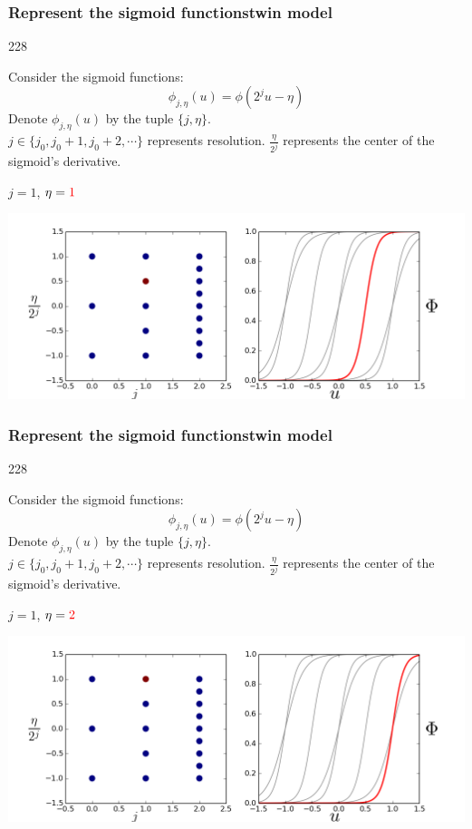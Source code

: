 \documentclass{beamer}
\newcommand{\barrow}{\item[\color{darkred}\ding{228}]}
\begin{document}
\setcounter{framenumber}{16} 
\begin{frame}
    \frametitle{Represent the sigmoid functions\hfill \scriptsize{twin model}}\small
    \begin{dinglist}{228}
        \barrow
        Consider the sigmoid functions:
        $$
            \phi_{j, \eta}(u) = \phi(2^j u - \eta)
        $$
        Denote $\phi_{j, \eta}(u)$ by the tuple $\{j, \eta\}$.\\
        \vspace{.2cm}
        $j\in \{j_0, j_0+1, j_0+2, \cdots \}$ represents resolution. $\frac{\eta}{2^j}$ represents
        the center of the sigmoid's derivative.
        \barrow $j=1$, $\eta=\textcolor{red}{1}$\\
        \begin{center}
            \includegraphics[width=10.cm]{basis_6.png}
        \end{center}
    \end{dinglist}
\end{frame}

\setcounter{framenumber}{16} 
\begin{frame}
    \frametitle{Represent the sigmoid functions\hfill \scriptsize{twin model}}\small
    \begin{dinglist}{228}
        \barrow
        Consider the sigmoid functions:
        $$
            \phi_{j, \eta}(u) = \phi(2^j u - \eta)
        $$
        Denote $\phi_{j, \eta}(u)$ by the tuple $\{j, \eta\}$.\\
        \vspace{.2cm}
        $j\in \{j_0, j_0+1, j_0+2, \cdots \}$ represents resolution. $\frac{\eta}{2^j}$ represents
        the center of the sigmoid's derivative.
        \barrow $j=1$, $\eta=\textcolor{red}{2}$\\
        \begin{center}
            \includegraphics[width=10.cm]{basis_7.png}
        \end{center}
    \end{dinglist}
\end{frame}
\end{document}
